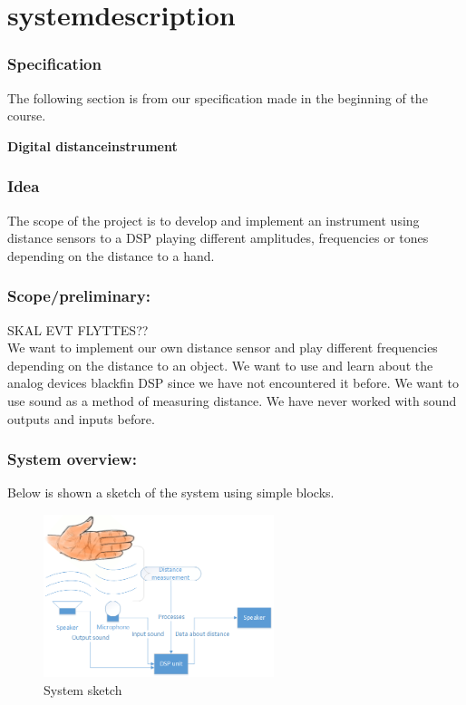 \chapter{systemdescription}
\subsection{Specification}
The following section is from our specification made in the beginning of the course.\\
\begin{center}
\textbf{\HUGE Digital distanceinstrument}\\
\end{center}
\subsection{Idea}
The scope of the project is to develop and implement an instrument using distance sensors to a DSP playing different amplitudes, frequencies or tones depending on the distance to a hand.
\subsection{Scope/preliminary:}
SKAL EVT FLYTTES??\\
We want to implement our own distance sensor and play different frequencies depending on the distance to an object. We want to use and learn about the analog devices blackfin DSP since we have not encountered it before. We want to use sound as a method of measuring distance. We have never worked with sound outputs and inputs before.
\subsection{System overview:}
Below is shown a sketch of the system using simple blocks.
\begin{figure}[H]
\centering
\includegraphics[width=0.6\textwidth]{billeder/systemoverview}
\caption{System sketch}
\label{fig:systemoverview}
\end{figure}

